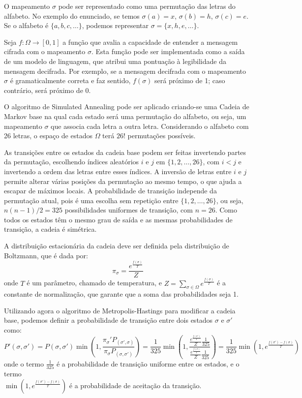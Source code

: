 \begin{resposta}
    O mapeamento $\sigma$ pode ser representado como uma permutação das letras do alfabeto. No exemplo do enunciado, se temos $\sigma(a) = x$, $\sigma(b) = h$, $\sigma(c) = e$. Se o alfabeto é $\{a, b, c, \ldots\}$, podemos representar $\sigma=\{x, h, e, \ldots\}$.

    Seja $f : \Omega \rightarrow [0,1]$ a função que avalia a capacidade de entender a mensagem cifrada com o mapeamento $\sigma$. Esta função pode ser implementada como a saída de um modelo de linguagem, que atribui uma pontuação à legibilidade da mensagem decifrada. Por exemplo, se a mensagem decifrada com o mapeamento $\sigma$ é gramaticalmente correta e faz sentido, $f(\sigma)$ será próximo de 1; caso contrário, será próximo de 0.

    O algoritmo de Simulated Annealing pode ser aplicado criando-se uma Cadeia de Markov base na qual cada estado será uma permutação do alfabeto, ou seja, um mapeamento $\sigma$ que associa cada letra a outra letra. Considerando o alfabeto com 26 letras, o espaço de estados $\Omega$ terá $26!$ permutações possíveis.

    As transições entre os estados da cadeia base podem ser feitas invertendo partes da permutação, escolhendo índices aleatórios $i$ e $j$ em $\{1, 2, \ldots, 26\}$, com $i<j$ e invertendo a ordem das letras entre esses índices. A inversão de letras entre $i$ e $j$ permite alterar várias posições da permutação ao mesmo tempo, o que ajuda a escapar de máximos locais. A probabilidade de transição independe da permutação atual, pois é uma escolha sem repetição entre $\{1, 2, \ldots, 26\}$, ou seja, $n(n-1)/2=325$ possibilidades uniformes de transição, com $n=26$. Como todos os estados têm o mesmo grau de saída e as mesmas probabilidades de transição, a cadeia é simétrica.

    A distribuição estacionária da cadeia deve ser definida pela distribuição de Boltzmann, que é dada por:
    $$ \pi_\sigma = \frac{e^{\frac{f(\sigma)}{T}}}{Z} $$
    onde $T$ é um parâmetro, chamado de temperatura, e $Z=\sum_{\sigma \in \Omega} e^{\frac{f(\sigma)}{T}}$ é a constante de normalização, que garante que a soma das probabilidades seja 1.

    Utilizando agora o algoritmo de Metropolis-Hastings para modificar a cadeia base, podemos definir a probabilidade de transição entre dois estados $\sigma$ e $\sigma'$ como:
    $$ P'(\sigma, \sigma') = 
    P(\sigma, \sigma') \min\left(1, \frac{\pi_\sigma' P_(\sigma', \sigma)}{\pi_\sigma P_(\sigma, \sigma')}\right) =  
    \frac{1}{325} \min\left(1, \frac{\frac{e^{\frac{f(\sigma')}{T}}}{Z} \frac{1}{325}}{\frac{e^{\frac{f(\sigma)}{T}}}{Z} \frac{1}{325}}\right)= 
    \frac{1}{325}\min\left(1, e^{\frac{f(\sigma')-f(\sigma)}{T}}\right) $$
    onde o termo $\frac{1}{325}$ é a probabilidade de transição uniforme entre os estados, e o termo \\ $\min\left(1, e^{\frac{f(\sigma')-f(\sigma)}{T}}\right)$ é a probabilidade de aceitação da transição.


\end{resposta}
